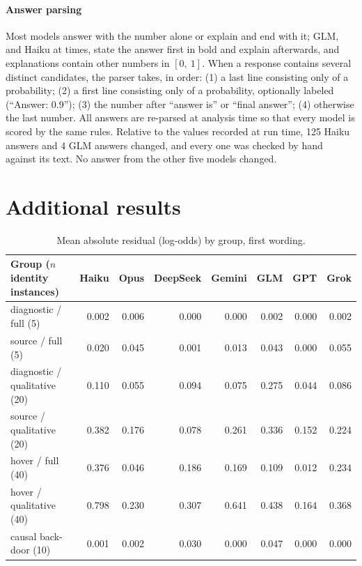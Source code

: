 \documentclass[11pt]{article}
\begin{document}
\paragraph{Answer parsing} Most models answer with the number alone or explain and end with it; GLM, and Haiku at times, state the answer first in bold and explain afterwards, and explanations contain other numbers in $[0,\ 1]$. When a response contains several distinct candidates, the parser takes, in order: (1) a last line consisting only of a probability; (2) a first line consisting only of a probability, optionally labeled (``Answer: 0.9''); (3) the number after ``answer is'' or ``final answer''; (4) otherwise the last number. All answers are re-parsed at analysis time so that every model is scored by the same rules. Relative to the values recorded at run time, 125 Haiku answers and 4 GLM answers changed, and every one was checked by hand against its text. No answer from the other five models changed.

\section{Additional results}
\label{app:groups}

\begin{table}[h]
\centering\footnotesize
\setlength{\tabcolsep}{5pt}
\begin{tabular}{@{}lrrrrrrr@{}}
\toprule
Group ($n$ identity instances) & Haiku & Opus & DeepSeek & Gemini & GLM & GPT & Grok \\
\midrule
diagnostic / full (5) & 0.002 & 0.006 & 0.000 & 0.000 & 0.002 & 0.000 & 0.002 \\
source / full (5) & 0.020 & 0.045 & 0.001 & 0.013 & 0.043 & 0.000 & 0.055 \\
diagnostic / qualitative (20) & 0.110 & 0.055 & 0.094 & 0.075 & 0.275 & 0.044 & 0.086 \\
source / qualitative (20) & 0.382 & 0.176 & 0.078 & 0.261 & 0.336 & 0.152 & 0.224 \\
hover / full (40) & 0.376 & 0.046 & 0.186 & 0.169 & 0.109 & 0.012 & 0.234 \\
hover / qualitative (40) & 0.798 & 0.230 & 0.307 & 0.641 & 0.438 & 0.164 & 0.368 \\
\midrule
causal back-door (10) & 0.001 & 0.002 & 0.030 & 0.000 & 0.047 & 0.000 & 0.000 \\
\bottomrule
\end{tabular}
\caption{Mean absolute residual (log-odds) by group, first wording.}
\label{tab:groups}
\end{table}
\end{document}
